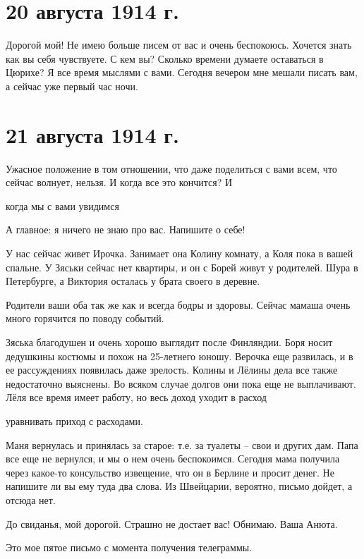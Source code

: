 \section{20 августа 1914 г.}


Дорогой мой! Не имею больше писем от вас и очень беспокоюсь. Хочется знать как
вы себя чувствуете. С кем вы? Сколько времени думаете оставаться в Цюрихе? Я
все время мыслями с вами. Сегодня вечером мне мешали писать вам, а сейчас уже
первый час ночи.

\section{21 августа 1914 г.}


Ужасное положение в том отношении, что даже поделиться с вами всем, что сейчас
волнует, нельзя. И когда все это кончится? И


\noindent
когда мы с вами увидимся\textellipsis

А главное: я ничего не знаю про вас. Напишите о себе!

У нас сейчас живет Ирочка. Занимает она Колину комнату, а Коля пока в вашей
спальне. У Зяськи сейчас нет квартиры, и он с Борей живут у родителей. Шура в
Петербурге, а Виктория осталась у брата своего в деревне.

Родители ваши оба так же как и всегда бодры и здоровы. Сейчас мамаша очень
много горячится по поводу событий.


Зяська благодушен и очень хорошо выглядит после Финляндии. Боря носит дедушкины
костюмы и похож на 25-летнего юношу. Верочка еще развилась, и в ее рассуждениях
появилась даже зрелость. Колины и Лёлины дела все также недостаточно выяснены.
Во всяком случае долгов они пока еще не выплачивают. Лёля все время имеет
работу, но весь доход уходит в расход


\noindent
уравнивать приход с расходами.

Маня вернулась и принялась за старое: т.е. за туалеты -- свои и других дам. Папа
все еще не вернулся, и мы о нем очень беспокоимся. Сегодня мама получила через
какое-то консульство извещение, что он в Берлине и просит денег. Не напишите ли
вы ему туда два слова. Из Швейцарии, вероятно, письмо дойдет, а отсюда нет.

До свиданья, мой дорогой. Страшно не достает вас! Обнимаю. Ваша Анюта.

Это мое пятое письмо с момента получения телеграммы.

